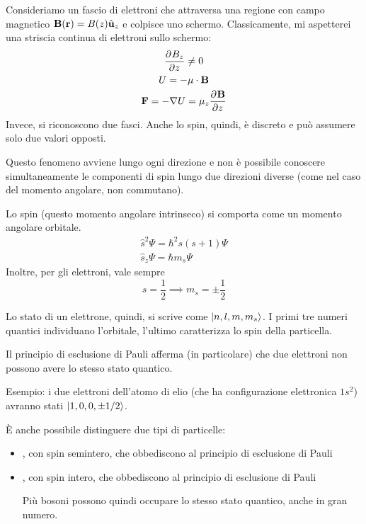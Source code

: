 Consideriamo un fascio di elettroni che attraversa una regione con campo magnetico $\mathbf{B}(\mathbf{r}) = B(z) \hat{\mathbf{u}}_{z}$ e colpisce uno schermo.
Classicamente, mi aspetterei una striscia continua di elettroni sullo schermo:
\begin{gather}
    \parder[B_z]{z} \ne 0 \\
    U = - \vt{\mu} \cdot \B \\
    \force = - \grad U = \mu_z \parder[\B]{z}
\end{gather}
Invece, si riconoscono due fasci.
Anche lo spin, quindi, è discreto e può assumere solo due valori opposti.

Questo fenomeno avviene lungo ogni direzione e non è possibile conoscere simultaneamente le componenti di spin lungo due direzioni diverse (come nel caso del momento angolare, non commutano).

Lo spin (questo momento angolare intrinseco) si comporta come un momento angolare orbitale.
\begin{gather}
    \hat{s}^2 \Psi = \hbar^2 s (s + 1) \Psi \\
    \hat{s}_z \Psi = \hbar m_s \Psi
\end{gather}
Inoltre, per gli elettroni, vale sempre
\begin{equation}
    s = \frac{1}{2} \implies m_s = \pm \frac{1}{2}
\end{equation}

Lo stato di un elettrone, quindi, si scrive come $\left\lvert n, l, m, m_s \right\rangle$.
I primi tre numeri quantici individuano l'orbitale, l'ultimo caratterizza lo spin della particella.

Il principio di esclusione di Pauli afferma (in particolare) che due elettroni non possono avere lo stesso stato quantico.

Esempio: i due elettroni dell'atomo di elio (che ha configurazione elettronica $1s^2$) avranno stati $\left\lvert 1, 0, 0, \pm 1/2 \right\rangle$.

È anche possibile distinguere due tipi di particelle:
\begin{itemize}
    \item {}, con spin semintero, che obbediscono al principio di esclusione di Pauli
    \item {}, con spin intero, che  obbediscono al principio di esclusione di Pauli

    Più bosoni possono quindi occupare lo stesso stato quantico, anche in gran numero.
\end{itemize}

